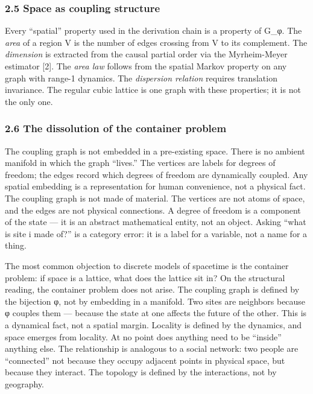 \documentclass[
]{article}
\begin{document}
\hypertarget{space-as-coupling-structure}{%
\subsubsection{2.5 Space as coupling
structure}\label{space-as-coupling-structure}}

Every ``spatial'' property used in the derivation chain is a property of
G\_φ. The \emph{area} of a region V is the number of edges crossing from
V to its complement. The \emph{dimension} is extracted from the causal
partial order via the Myrheim-Meyer estimator {[}2{]}. The \emph{area
law} follows from the spatial Markov property on any graph with range-1
dynamics. The \emph{dispersion relation} requires translation
invariance. The regular cubic lattice is one graph with these
properties; it is not the only one.

\hypertarget{the-dissolution-of-the-container-problem}{%
\subsubsection{2.6 The dissolution of the container
problem}\label{the-dissolution-of-the-container-problem}}

The coupling graph is not embedded in a pre-existing space. There is no
ambient manifold in which the graph ``lives.'' The vertices are labels
for degrees of freedom; the edges record which degrees of freedom are
dynamically coupled. Any spatial embedding is a representation for human
convenience, not a physical fact. The coupling graph is not made of
material. The vertices are not atoms of space, and the edges are not
physical connections. A degree of freedom is a component of the state
--- it is an abstract mathematical entity, not an object. Asking ``what
is site i made of?'' is a category error: it is a label for a variable,
not a name for a thing.

The most common objection to discrete models of spacetime is the
container problem: if space is a lattice, what does the lattice sit in?
On the structural reading, the container problem does not arise. The
coupling graph is defined by the bijection φ, not by embedding in a
manifold. Two sites are neighbors because φ couples them --- because the
state at one affects the future of the other. This is a dynamical fact,
not a spatial margin. Locality is defined by the dynamics, and space
emerges from locality. At no point does anything need to be ``inside''
anything else. The relationship is analogous to a social network: two
people are ``connected'' not because they occupy adjacent points in
physical space, but because they interact. The topology is defined by
the interactions, not by geography.
\end{document}
